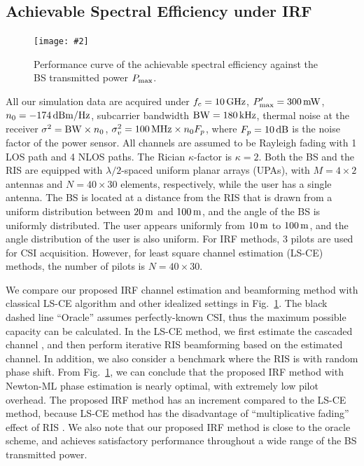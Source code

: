 \documentclass[conference,10pt,twocolumn]{IEEEtran}
\theoremstyle{nonumberplain}
\newcommand{\myincludegraphics}[2][width=8.5cm]{\texttt{[image: \#2]}}
\begin{document}
\subsection{Achievable Spectral Efficiency under IRF} \label{Achievable Spectral Efficiency under IRF}
    \begin{figure}[!t]
        \centering
        \myincludegraphics{data/rate-ML.pdf}
        \caption{Performance curve of the achievable spectral efficiency against the BS transmitted power $P_{\rm max}$.}
        \label{fig:rate}
    \end{figure}
    All our simulation data are acquired under $f_c = 10\,{\rm GHz}$, $P_{\rm max}'=300 \,{\rm mW}$, $n_0=-174\,{\rm dBm/Hz}$, subcarrier bandwidth ${\rm BW} = 180\,{\rm kHz}$, thermal noise at the receiver $\sigma^2 = {\rm BW}\times n_0$, $\sigma_v^2=100\,{\rm MHz}\times n_0 F_p$, where $F_p=10\,{\rm dB}$ is the noise factor of the power sensor.
    All channels are assumed to be Rayleigh fading with 1 \ac{LOS} path and 4 \ac{NLOS} paths. 
    The Rician $\kappa$-factor is $\kappa=2$. 
    Both the BS and the RIS are equipped with $\lambda/2$-spaced uniform planar arrays (UPAs), with $M=4\times 2$ antennas and $N=40\times 30$ elements, respectively, while the user has a single antenna. 
    The BS is located at a distance from the RIS that is drawn from a uniform distribution between $20\,{\rm m}$ and $100\,{\rm m}$, and the angle of the BS is uniformly distributed. 
    The user appears uniformly from $10\,{\rm m}$ to $100\,{\rm m}$, and the angle distribution of the user is also uniform. 
    For IRF methods, 3 pilots are used for CSI acquisition. 
    However, for least square channel estimation (LS-CE) methods, the number of pilots is $N=40\times 30$. 

    We compare our proposed \ac{IRF} channel estimation and beamforming method with classical LS-CE algorithm and other idealized settings in Fig.~\ref{fig:rate}. 
    The black dashed line ``Oracle'' assumes perfectly-known CSI, thus the maximum possible capacity can be calculated. 
    In the LS-CE method, we first estimate the cascaded channel \cite{kundu2021channel,wei2021channel}, and then perform iterative RIS beamforming based on the estimated channel. 
    In addition, we also consider a benchmark where the RIS is with random phase shift.  
    From Fig.~\ref{fig:rate}, we can conclude that the proposed IRF method with Newton-ML phase estimation is nearly optimal, with extremely low pilot overhead. The proposed IRF method has an increment compared to the LS-CE method, because LS-CE method has the disadvantage of “multiplicative fading” effect of RIS \cite{liu2021active}.
    We also note that our proposed IRF method is close to the oracle scheme, and achieves satisfactory performance throughout a wide range of the BS transmitted power. 
\end{document}
